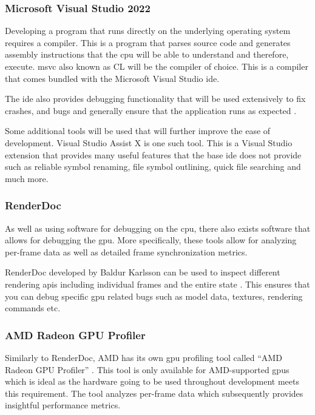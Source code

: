 \documentclass[11pt]{article}
\begin{document}
\subsubsection{Microsoft Visual Studio 2022}
Developing a program that runs directly on the underlying operating system
requires a compiler. This is a program that parses source code and generates
assembly instructions that the \gls*{cpu} will be able to understand and
therefore, execute. \gls*{msvc} also known as CL will be the compiler of choice.
This is a compiler that comes bundled with the Microsoft Visual Studio
\gls*{ide}.

The \gls*{ide} also provides debugging functionality that will be used
extensively to fix crashes, and bugs and generally ensure that the application
runs as expected \cite{visualstudio}. 

Some additional tools will be used that will further improve the ease of
development.  Visual Studio Assist X \cite{visualstudioassistx} is one such
tool. This is a Visual Studio extension that provides many useful features that
the base \gls*{ide} does not provide such as reliable symbol renaming, file symbol
outlining, quick file searching and much more.


\subsubsection{RenderDoc}
As well as using software for debugging on the \gls*{cpu}, there also exists
software that allows for debugging the \gls*{gpu}. More specifically, these tools
allow for analyzing per-frame data as well as detailed frame synchronization
metrics.

RenderDoc developed by Baldur Karlsson can be used to inspect different
rendering \glspl*{api} including individual frames and the entire state
\cite{renderdoc}. This ensures that you can debug specific \gls*{gpu} related
bugs such as model data, textures, rendering commands etc.


\subsubsection{AMD Radeon GPU Profiler}
Similarly to RenderDoc, AMD has its own \gls*{gpu} profiling tool called ``AMD
Radeon GPU Profiler'' \cite{rgp}. This tool is only available for AMD-supported
\glspl*{gpu} which is ideal as the hardware going to be used throughout
development meets this requirement. The tool analyzes per-frame data which
subsequently provides insightful performance metrics.
\end{document}
